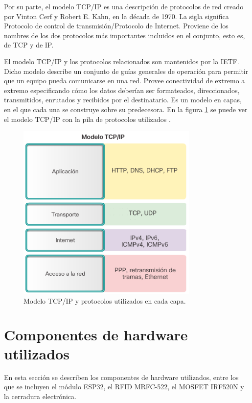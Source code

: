 Por su parte, el modelo TCP/IP es una descripción de protocolos de red creado por Vinton Cerf y Robert E. Kahn, en la década de 1970. La sigla significa Protocolo de control de transmisión/Protocolo de Internet. Proviene de los nombres de los dos protocolos más importantes incluidos en el conjunto, esto es, de TCP y de IP. 

El modelo TCP/IP y los protocolos relacionados son mantenidos por la IETF. Dicho modelo describe un conjunto de guías generales de operación para permitir que un equipo pueda comunicarse en una red. Provee conectividad de extremo a extremo especificando cómo los datos deberían ser formateados, direccionados, transmitidos, enrutados y recibidos por el destinatario. Es un modelo en capas, en el que cada una se construye sobre su predecesora. En la figura \ref{fig:capasHTTP} se puede ver el modelo TCP/IP con la pila de protocolos utilizados \citep{WEBSITE:CiscoHTTP}.

\begin{figure}[ht]
	\centering
	\includegraphics[width=0.8\textwidth]{./Figures/http.png}
	\caption{Modelo TCP/IP y protocolos utilizados en cada capa.}
	\label{fig:capasHTTP}
\end{figure} 

\pagebreak
\section{Componentes de hardware utilizados}

En esta sección se describen los componentes de hardware utilizados, entre los que se incluyen el módulo ESP32, el RFID MRFC-522, el MOSFET IRF520N y la cerradura electrónica.

